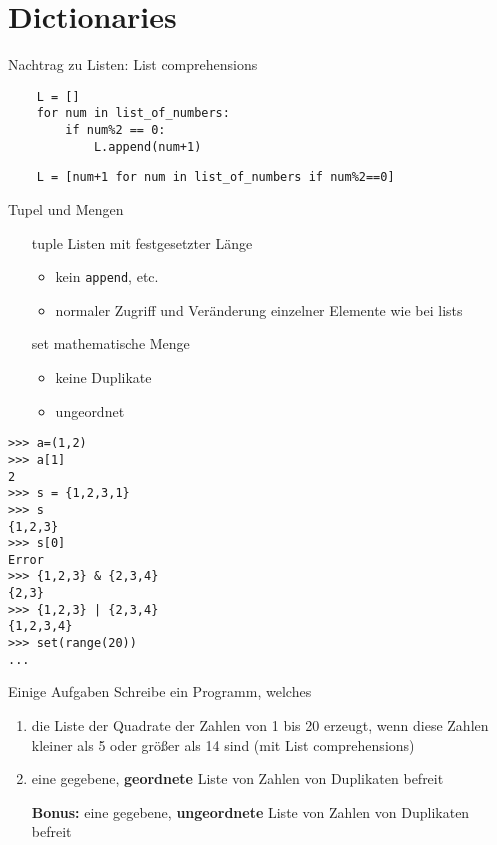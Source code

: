 \section{Dictionaries}
\begin{frame}[fragile]{Nachtrag zu Listen: List comprehensions}
\begin{lstlisting}
    L = []
    for num in list_of_numbers:
        if num%2 == 0:
            L.append(num+1)
\end{lstlisting}
\begin{lstlisting}
    L = [num+1 for num in list_of_numbers if num%2==0]
\end{lstlisting}
\end{frame}

\begin{frame}[fragile]{Tupel und Mengen}
	\begin{itemize}
		\item[tuple] Listen mit festgesetzter Länge
		\begin{itemize}
			\item kein \texttt{append}, etc.
			\item normaler Zugriff und Veränderung einzelner Elemente wie bei lists
		\end{itemize}
		\item[set] mathematische Menge
		\begin{itemize}
			\item keine Duplikate
			\item ungeordnet
		\end{itemize}
	\end{itemize}
\begin{lstlisting}
>>> a=(1,2)
>>> a[1]
2
>>> s = {1,2,3,1}
>>> s
{1,2,3}
>>> s[0]
Error
>>> {1,2,3} & {2,3,4}
{2,3}
>>> {1,2,3} | {2,3,4}
{1,2,3,4}
>>> set(range(20))
...
\end{lstlisting}
\end{frame}

\begin{frame}{Einige Aufgaben}
	Schreibe ein Programm, welches
	\begin{enumerate}
		\item die Liste der Quadrate der Zahlen von 1 bis 20 erzeugt, wenn diese Zahlen kleiner als 5 oder größer als 14 sind (mit List comprehensions)
		\item eine gegebene, \textbf{geordnete} Liste von Zahlen von Duplikaten befreit
		\item[\textbf{Bonus:}] eine gegebene, \textbf{ungeordnete} Liste von Zahlen von Duplikaten befreit
	\end{enumerate}
\end{frame}

